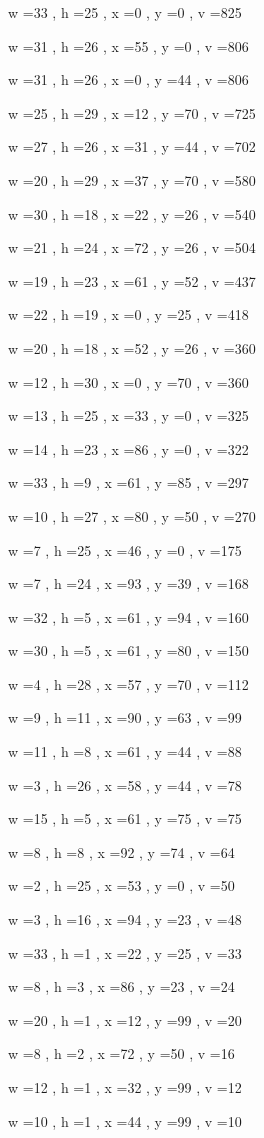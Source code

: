 \documentclass[11pt]{article}
\begin{document}
w =33 , h =25 , x =0 , y =0 , v =825
\par
w =31 , h =26 , x =55 , y =0 , v =806
\par
w =31 , h =26 , x =0 , y =44 , v =806
\par
w =25 , h =29 , x =12 , y =70 , v =725
\par
w =27 , h =26 , x =31 , y =44 , v =702
\par
w =20 , h =29 , x =37 , y =70 , v =580
\par
w =30 , h =18 , x =22 , y =26 , v =540
\par
w =21 , h =24 , x =72 , y =26 , v =504
\par
w =19 , h =23 , x =61 , y =52 , v =437
\par
w =22 , h =19 , x =0 , y =25 , v =418
\par
w =20 , h =18 , x =52 , y =26 , v =360
\par
w =12 , h =30 , x =0 , y =70 , v =360
\par
w =13 , h =25 , x =33 , y =0 , v =325
\par
w =14 , h =23 , x =86 , y =0 , v =322
\par
w =33 , h =9 , x =61 , y =85 , v =297
\par
w =10 , h =27 , x =80 , y =50 , v =270
\par
w =7 , h =25 , x =46 , y =0 , v =175
\par
w =7 , h =24 , x =93 , y =39 , v =168
\par
w =32 , h =5 , x =61 , y =94 , v =160
\par
w =30 , h =5 , x =61 , y =80 , v =150
\par
w =4 , h =28 , x =57 , y =70 , v =112
\par
w =9 , h =11 , x =90 , y =63 , v =99
\par
w =11 , h =8 , x =61 , y =44 , v =88
\par
w =3 , h =26 , x =58 , y =44 , v =78
\par
w =15 , h =5 , x =61 , y =75 , v =75
\par
w =8 , h =8 , x =92 , y =74 , v =64
\par
w =2 , h =25 , x =53 , y =0 , v =50
\par
w =3 , h =16 , x =94 , y =23 , v =48
\par
w =33 , h =1 , x =22 , y =25 , v =33
\par
w =8 , h =3 , x =86 , y =23 , v =24
\par
w =20 , h =1 , x =12 , y =99 , v =20
\par
w =8 , h =2 , x =72 , y =50 , v =16
\par
w =12 , h =1 , x =32 , y =99 , v =12
\par
w =10 , h =1 , x =44 , y =99 , v =10
\par
\newpage
\end{document}
